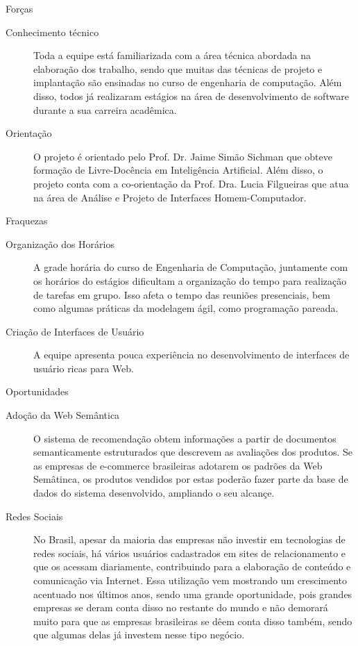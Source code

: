 \documentclass[]{article}
\begin{document}
\begin{description}
  \item Forças
  \begin{description}
    \item[Conhecimento técnico] Toda a equipe está familiarizada com a área técnica abordada na elaboração dos trabalho, sendo que muitas das técnicas de projeto e implantação são ensinadas no curso de engenharia de computação. Além disso, todos já realizaram estágios na área de desenvolvimento de software durante a sua carreira acadêmica.
    
    \item[Orientação] 
    
     O projeto é orientado pelo Prof. Dr. Jaime Simão Sichman que obteve formação de Livre-Docência em Inteligência Artificial. Além disso, o projeto conta com a co-orientação da Prof. Dra. Lucia Filgueiras que atua na área de Análise e Projeto de Interfaces Homem-Computador.
     
  \end{description}
  
  \item Fraquezas
  \begin{description}
    \item[Organização dos Horários] A grade horária do curso de Engenharia de Computação, juntamente com os horários do estágios dificultam a organização do tempo para realização de tarefas em grupo. Isso afeta o tempo das reuniões presenciais, bem como algumas práticas da modelagem ágil, como programação pareada.
    \item[Criação de Interfaces de Usuário] A equipe apresenta pouca experiência no desenvolvimento de interfaces de usuário ricas para Web.
  \end{description}
  
  \item Oportunidades
  \begin{description}
    \item[Adoção da Web Semântica] O sistema de recomendação obtem informações a partir de documentos semanticamente estruturados que descrevem as avaliações dos produtos. Se as empresas de e-commerce brasileiras adotarem os padrões da Web Semâtinca, os produtos vendidos por estas poderão fazer parte da base de dados do sistema desenvolvido, ampliando o seu alcançe.
    \item[Redes Sociais]
         No Brasil, apesar da maioria das empresas não investir em tecnologias de redes sociais, há vários usuários cadastrados em sites de relacionamento e que os acessam diariamente, contribuindo para a elaboração de conteúdo e comunicação via Internet. Essa utilização vem mostrando um crescimento acentuado nos últimos anos, sendo uma grande oportunidade, pois grandes empresas se deram conta disso no restante do mundo e não demorará muito para que as empresas brasileiras se dêem conta disso também, sendo que algumas delas já investem nesse tipo negócio.
  \end{description}
  

\end{description}
\end{document}
